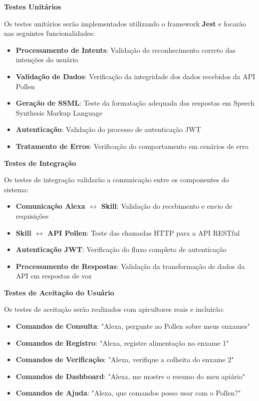 \textbf{Testes Unitários}

Os testes unitários serão implementados utilizando o framework \textbf{Jest} e focarão nas seguintes funcionalidades:

\begin{itemize}
    \item \textbf{Processamento de Intents}: Validação do reconhecimento correto das intenções do usuário
    \item \textbf{Validação de Dados}: Verificação da integridade dos dados recebidos da API Pollen
    \item \textbf{Geração de SSML}: Teste da formatação adequada das respostas em Speech Synthesis Markup Language
    \item \textbf{Autenticação}: Validação do processo de autenticação JWT
    \item \textbf{Tratamento de Erros}: Verificação do comportamento em cenários de erro
\end{itemize}

\textbf{Testes de Integração}

Os testes de integração validarão a comunicação entre os componentes do sistema:

\begin{itemize}
    \item \textbf{Comunicação Alexa $\leftrightarrow$ Skill}: Validação do recebimento e envio de requisições
    \item \textbf{Skill $\leftrightarrow$ API Pollen}: Teste das chamadas HTTP para a API RESTful
    \item \textbf{Autenticação JWT}: Verificação do fluxo completo de autenticação
    \item \textbf{Processamento de Respostas}: Validação da transformação de dados da API em respostas de voz
\end{itemize}

\textbf{Testes de Aceitação do Usuário}

Os testes de aceitação serão realizados com apicultores reais e incluirão:

\begin{itemize}
    \item \textbf{Comandos de Consulta}: "Alexa, pergunte ao Pollen sobre meus enxames"
    \item \textbf{Comandos de Registro}: "Alexa, registre alimentação no enxame 1"
    \item \textbf{Comandos de Verificação}: "Alexa, verifique a colheita do enxame 2"
    \item \textbf{Comandos de Dashboard}: "Alexa, me mostre o resumo do meu apiário"
    \item \textbf{Comandos de Ajuda}: "Alexa, que comandos posso usar com o Pollen?"
\end{itemize}

